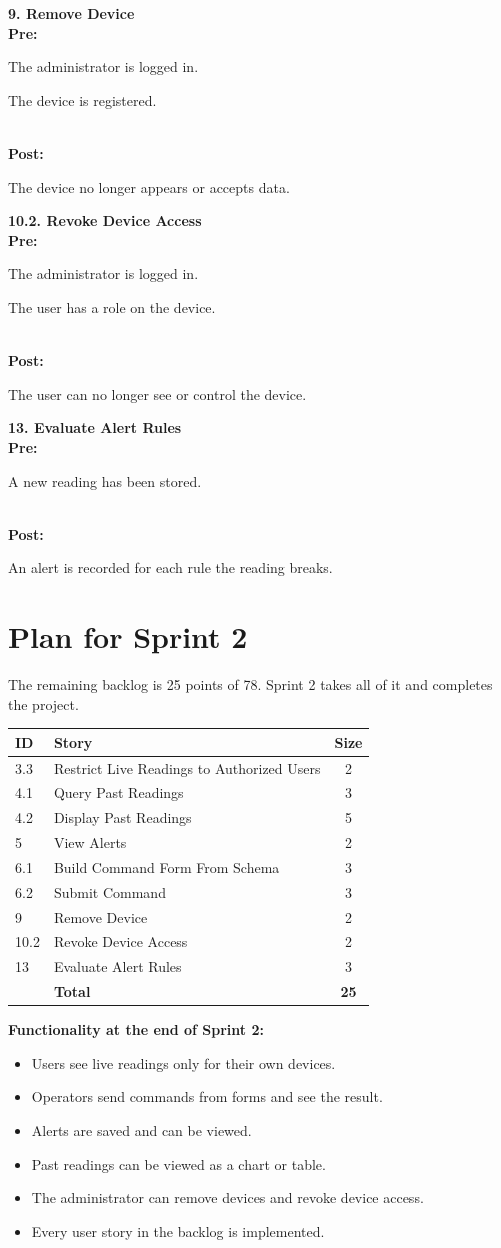 \documentclass[11pt]{article}
\newcommand{\story}[4]{%
  \par\smallskip\noindent\begin{minipage}{\linewidth}
  \textbf{#1. #2}\\
  \textbf{Pre:} \begin{itemize*}[label={}, itemjoin={{ }}]#3\end{itemize*}\\
  \textbf{Post:} \begin{itemize*}[label={}, itemjoin={{ }}]#4\end{itemize*}
  \end{minipage}\par
}
\begin{document}
\story{9}{Remove Device}
{\item The administrator is logged in.
 \item The device is registered.}
{\item The device no longer appears or accepts data.}

\story{10.2}{Revoke Device Access}
{\item The administrator is logged in.
 \item The user has a role on the device.}
{\item The user can no longer see or control the device.}

\story{13}{Evaluate Alert Rules}
{\item A new reading has been stored.}
{\item An alert is recorded for each rule the reading breaks.}

\section{Plan for Sprint 2}

The remaining backlog is 25 points of 78. Sprint 2 takes all of it and completes the project.

\begin{center}
\begin{tabularx}{0.7\textwidth}{@{} l X c @{}}
\toprule
\textbf{ID} & \textbf{Story} & \textbf{Size} \\
\midrule
3.3 & Restrict Live Readings to Authorized Users & 2 \\
4.1 & Query Past Readings & 3 \\
4.2 & Display Past Readings & 5 \\
5 & View Alerts & 2 \\
6.1 & Build Command Form From Schema & 3 \\
6.2 & Submit Command & 3 \\
9 & Remove Device & 2 \\
10.2 & Revoke Device Access & 2 \\
13 & Evaluate Alert Rules & 3 \\
\midrule
 & \textbf{Total} & \textbf{25} \\
\bottomrule
\end{tabularx}
\end{center}

\textbf{Functionality at the end of Sprint 2:}
\begin{itemize}[leftmargin=1.5em]
\item Users see live readings only for their own devices.
\item Operators send commands from forms and see the result.
\item Alerts are saved and can be viewed.
\item Past readings can be viewed as a chart or table.
\item The administrator can remove devices and revoke device access.
\item Every user story in the backlog is implemented.
\end{itemize}
\end{document}
